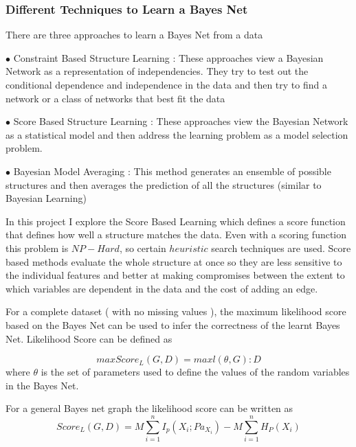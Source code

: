 \subsubsection{Different Techniques to Learn a Bayes Net}

There are three approaches to learn a Bayes Net from a data

$\bullet$ Constraint Based Structure Learning : These approaches view a Bayesian Network as a representation of independencies. They try to test out the conditional dependence and independence in the data and then try to find a network or a class of networks that best fit the data

\bigskip

$\bullet$ Score Based Structure Learning :  These approaches view the Bayesian Network as a statistical model and then address the learning problem as a model selection problem.

\bigskip

$\bullet$ Bayesian Model Averaging : This method generates an ensemble of possible structures and then averages the prediction of all the structures (similar to Bayesian Learning) 

\bigskip

In this project I explore the Score Based Learning which defines a score function that defines how well a structure matches the data. Even with a scoring function this problem is  $NP-Hard$, so certain $heuristic$ search techniques are used.
Score based methods evaluate the whole structure at once so they are less sensitive to the individual features and better at making compromises between the extent to which variables are dependent in the data and the cost of adding an edge.

For a complete dataset ( with no missing values ), the maximum likelihood score based on the Bayes Net can be used to infer the correctness of the learnt Bayes Net.
\newpage
Likelihood Score can be defined as

\begin{equation}
max{Score_L(G,D)}=max{l(\theta,G):D}
\end{equation}
where $\theta$ is the set of parameters used to define the values of the random variables in the Bayes Net.

For a general Bayes net graph the likelihood score can be written as 
\begin{equation}
{Score_L(G,D)}=M\sum_{i=1}^n I_p(X_i;Pa_{X_i})  -M\sum_{i=1}^{n}H_{P}(X_i)
\end{equation}

